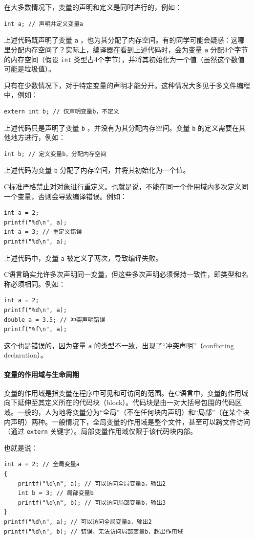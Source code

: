 在大多数情况下，变量的声明和定义是同时进行的，例如：
\begin{verbatim}
int a; // 声明并定义变量a
\end{verbatim}
上述代码既声明了变量 \texttt{a} ，也为其分配了内存空间。有的同学可能会疑惑：这哪里分配内存空间了？实际上，编译器在看到上述代码时，会为变量 \texttt{a} 分配4个字节的内存空间（假设 \texttt{int} 类型占4个字节），并将其初始化为一个值（虽然这个数值可能是垃圾值）。

只有在少数情况下，对于特定变量的声明才能分开。这种情况大多见于多文件编程中，例如：
\begin{verbatim}
extern int b; // 仅声明变量b，不定义
\end{verbatim}
上述代码只是声明了变量 \texttt{b} ，并没有为其分配内存空间。变量 \texttt{b} 的定义需要在其他地方进行，例如：
\begin{verbatim}
int b; // 定义变量b，分配内存空间
\end{verbatim}
上述代码为变量 \texttt{b} 分配了内存空间，并将其初始化为一个值。

C标准严格禁止对对象进行重定义。也就是说，不能在同一个作用域内多次定义同一个变量，否则会导致编译错误。例如：
\begin{verbatim}
int a = 2;
printf("%d\n", a);
int a = 3; // 重定义错误
printf("%d\n", a);
\end{verbatim}
上述代码中，变量 \texttt{a} 被定义了两次，导致编译失败。

C语言确实允许多次声明同一变量，但这些多次声明必须保持一致性，即类型和名称必须相同。例如：
\begin{verbatim}
int a = 2;
printf("%d\n", a);
double a = 3.5; // 冲突声明错误
printf("%f\n", a);
\end{verbatim}
这个也是错误的，因为变量 \texttt{a} 的类型不一致，出现了“冲突声明”（conflicting declaration）。

\paragraph{变量的作用域与生命周期}

变量的作用域是指变量在程序中可见和可访问的范围。在C语言中，变量的作用域向下延伸至其定义所在的代码块（block）。代码块是由一对大括号包围的代码区域。一般的，人为地将变量分为“全局”（不在任何块内声明）和“局部”（在某个块内声明）两种。一般情况下，全局变量的作用域是整个文件，甚至可以跨文件访问（通过 \texttt{extern} 关键字）。局部变量作用域仅限于该代码块内部。

也就是说：
\begin{verbatim}
int a = 2; // 全局变量a
{
    printf("%d\n", a); // 可以访问全局变量a，输出2
    int b = 3; // 局部变量b
    printf("%d\n", b); // 可以访问局部变量b，输出3
}
printf("%d\n", a); // 可以访问全局变量a，输出2
printf("%d\n", b); // 错误，无法访问局部变量b，超出作用域
\end{verbatim}

